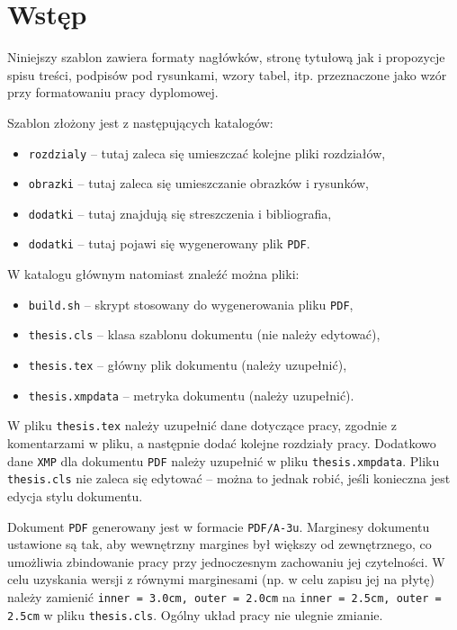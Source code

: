 \chapter{Wstęp}

Niniejszy szablon zawiera formaty nagłówków, stronę tytułową jak i propozycje spisu treści, podpisów pod rysunkami, wzory tabel, itp. przeznaczone jako wzór przy formatowaniu pracy dyplomowej.

Szablon złożony jest z następujących katalogów:
\begin{itemize}
\item \verb|rozdzialy| -- tutaj zaleca się umieszczać kolejne pliki rozdziałów,
\item \verb|obrazki|   -- tutaj zaleca się umieszczanie obrazków i rysunków,
\item \verb|dodatki|   -- tutaj znajdują się streszczenia i bibliografia,
\item \verb|dodatki|   -- tutaj pojawi się wygenerowany plik \verb|PDF|.
\end{itemize}

W katalogu głównym natomiast znaleźć można pliki:
\begin{itemize}
\item \verb|build.sh|       -- skrypt stosowany do wygenerowania pliku \verb|PDF|,
\item \verb|thesis.cls|     -- klasa szablonu dokumentu (nie należy edytować),
\item \verb|thesis.tex|     -- główny plik dokumentu (należy uzupełnić),
\item \verb|thesis.xmpdata| -- metryka dokumentu (należy uzupełnić).
\end{itemize}

W pliku \verb|thesis.tex| należy uzupełnić dane dotyczące pracy, zgodnie z komentarzami w pliku, a następnie dodać kolejne rozdziały pracy. Dodatkowo dane \verb|XMP| dla dokumentu \verb|PDF| należy uzupełnić w pliku \verb|thesis.xmpdata|. Pliku \verb|thesis.cls| nie zaleca się edytować -- można to jednak robić, jeśli konieczna jest edycja stylu dokumentu.

Dokument \verb|PDF| generowany jest w formacie \verb|PDF/A-3u|. Marginesy dokumentu ustawione są tak, aby wewnętrzny margines był większy od zewnętrznego, co umożliwia zbindowanie pracy przy jednoczesnym zachowaniu jej czytelności. W celu uzyskania wersji z równymi marginesami (np. w celu zapisu jej na płytę) należy zamienić \verb|inner = 3.0cm, outer = 2.0cm| na \verb|inner = 2.5cm, outer = 2.5cm| w pliku \verb|thesis.cls|. Ogólny układ pracy nie ulegnie zmianie.
